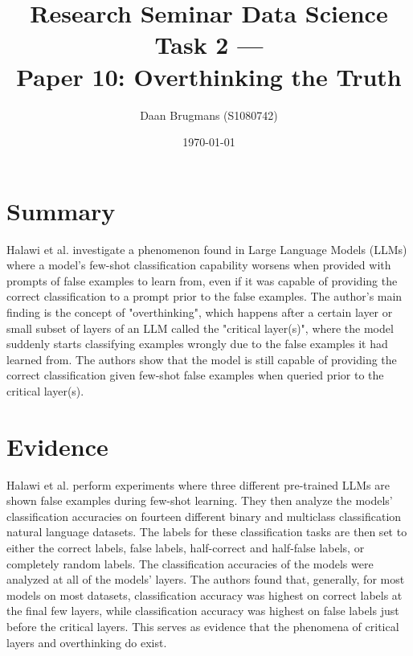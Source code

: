 \documentclass{IEEEtran}
\begin{document}
\title{Research Seminar Data Science Task 2 ---\\Paper 10: Overthinking the Truth}
\author{Daan Brugmans (S1080742)}
\date{\today}

\maketitle

\section{Summary}
Halawi et al. investigate a phenomenon found in Large Language Models (LLMs) where a model's few-shot classification capability worsens when provided with prompts of false examples to learn from, even if it was capable of providing the correct classification to a prompt prior to the false examples.
The author's main finding is the concept of "overthinking", which happens after a certain layer or small subset of layers of an LLM called the "critical layer(s)", where the model suddenly starts classifying examples wrongly due to the false examples it had learned from.
The authors show that the model is still capable of providing the correct classification given few-shot false examples when queried prior to the critical layer(s).

\section{Evidence}
Halawi et al. perform experiments where three different pre-trained LLMs are shown false examples during few-shot learning.
They then analyze the models' classification accuracies on fourteen different binary and multiclass classification natural language datasets.
The labels for these classification tasks are then set to either the correct labels, false labels, half-correct and half-false labels, or completely random labels.
The classification accuracies of the models were analyzed at all of the models' layers.
The authors found that, generally, for most models on most datasets, classification accuracy was highest on correct labels at the final few layers, while classification accuracy was highest on false labels just before the critical layers.
This serves as evidence that the phenomena of critical layers and overthinking do exist.
\end{document}
